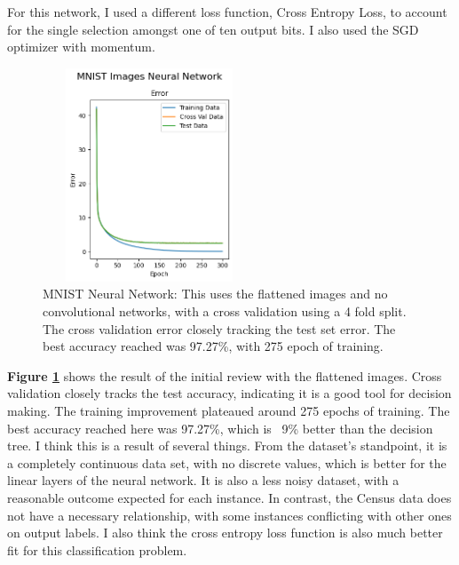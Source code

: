\documentclass[letterpaper]{article} %
\begin{document}
For this network, I used a different loss function, Cross Entropy Loss, to account for the single selection amongst one of ten output bits.  I also used the SGD optimizer with momentum. 

\begin{figure}[h]
\centering
\includegraphics[width=2.5in, height=2.5in]{figures/MNIST_Images_Neural_Network_Error_MNIST.png}
\caption{MNIST Neural Network:  This uses the flattened images and no convolutional networks, with a cross validation using a 4 fold split.  The cross validation error closely tracking the test set error. The best accuracy reached was 97.27\%,  with 275 epoch of training.  }
\label{fig:MNIST_Error_neural_network}
\end{figure}

\textbf{Figure \ref{fig:MNIST_Error_neural_network}} shows the result of the initial review with the flattened images.  Cross validation closely tracks the test accuracy, indicating it is a good tool for decision making.  The training improvement plateaued around 275 epochs of training.  The best accuracy reached here was 97.27\%, which is ~9\% better than the decision tree.  I think this is a result of several things.  From the dataset's standpoint, it is a completely continuous data set, with no discrete values, which is better for the linear layers of the neural network.  It is also a less noisy dataset, with a reasonable outcome expected for each instance.  In contrast, the Census data does not have a necessary relationship, with some instances conflicting with other ones on output labels.  I also think the cross entropy loss function is also much better fit for this classification problem.
\end{document}
